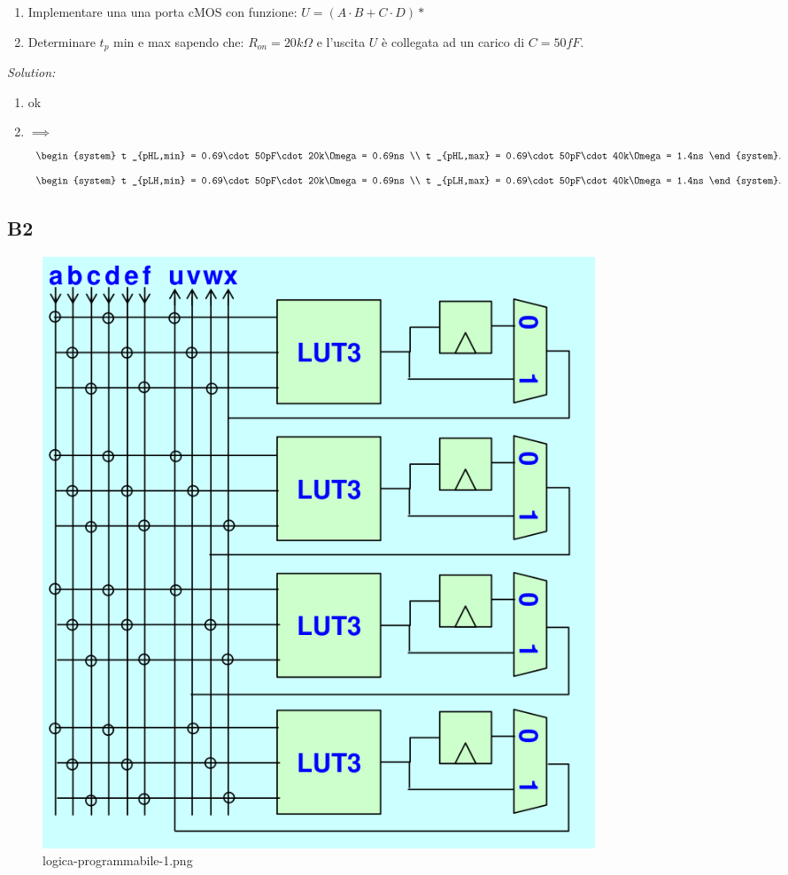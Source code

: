 \documentclass[12pt]{article}
\begin{document}
\begin{problem}{}{}
    \begin{enumerate}
        \item Implementare una una porta cMOS con funzione: $U = (A\cdot B + C\cdot D)*$
        \item Determinare $t_p$ min e max sapendo che: $R _{on} = 20k\Omega$ e l'uscita $U$ \`e collegata ad un carico di $C=50fF$.
    \end{enumerate}
    
    \emph{Solution:}
    \begin{enumerate}
        \item  ok
        \item $ \implies $
            \[ \begin{system} 
                t _{pHL,min} = 0.69\cdot 50pF\cdot 20k\Omega = 0.69ns \\
                t _{pHL,max} = 0.69\cdot 50pF\cdot 40k\Omega = 1.4ns
            \end{system}  .\]
            \[ \begin{system} 
                t _{pLH,min} = 0.69\cdot 50pF\cdot 20k\Omega = 0.69ns \\
                t _{pLH,max} = 0.69\cdot 50pF\cdot 40k\Omega = 1.4ns
            \end{system}  .\]
    \end{enumerate}
\end{problem}

\begin{problem}{}{}
    
\end{problem}

\subsection{B2}
\begin{problem}{}{}
    \begin{figure}[H]
        \centering
        \includegraphics[width=0.8\textwidth]{logica-programmabile-1.png}
        \caption{logica-programmabile-1.png}
        \label{fig:logica-programmabile-1-png}
    \end{figure}
\end{problem}
\end{document}
